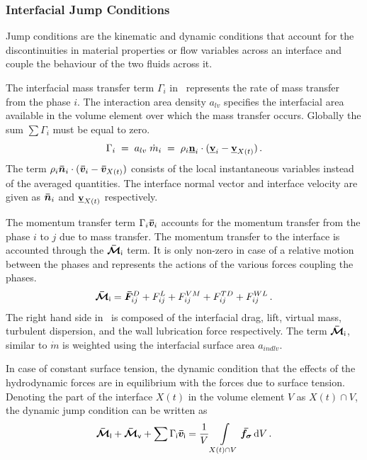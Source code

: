 \subsubsection{Interfacial Jump Conditions}\label{sec:jumps}
Jump conditions are the kinematic and dynamic conditions that 
account for the discontinuities in material properties 
or flow variables across an interface and couple the behaviour of the two 
fluids across it.

The interfacial mass transfer term $\Gamma_{i}$ in~
 represents the rate of mass transfer from the phase $i$. The interaction area density $a_{lv}$ specifies 
 the interfacial area available in the volume element over which the mass transfer occurs.
 Globally the sum $\sum\Gamma_{i}$ must be equal to zero.
\begin{equation}
 \Gamma_{i}\;=\;a_{lv}\;\dot{m}_{i}\;=\; \rho_{i} \mathbf{\underline{n}}_{i} \cdot (\mathbf{\underline{v}}_{i} - \mathbf{\underline{v}}_{X(t)})\,.
\end{equation}
The term $\rho_{i} \bm{\bar{n}}_{i} \cdot (\bm{\bar{v}}_{i} - \bm{\bar{v}}_{X(t)})$ consists of the local instantaneous 
 variables instead of the averaged quantities. The interface normal vector and interface 
 velocity are given as $\bm{\bar{n}}_{i}$ and $\mathbf{\underline{v}}_{X(t)}$ respectively. 

The momentum transfer term $\Gamma_{i}\bm{\bar{v}}_{i}$ accounts for the momentum transfer from 
 the phase $i$ to $j$ due to mass transfer. The momentum transfer to the interface is accounted through 
 the \(\bm{\bar{\mathcal{M}}}_{\mathsf {i}}\) term. It is only non-zero in case 
 of a relative motion between the phases and represents the actions of the various forces coupling the phases.
 \begin{equation}\label{eq:mom-trans}
  \bm{\bar{\mathcal{M}}}_{\mathsf {i}} = \bm{\bar{F}}_{ij}^{D} + F_{ij}^{L} + F_{ij}^{VM} + F_{ij}^{TD} + F_{ij}^{WL}\,.
 \end{equation}
The right hand side in~ is composed of the interfacial drag, lift, virtual mass, turbulent 
dispersion, and the wall lubrication force respectively. The term $\bm{\bar{\mathcal{M}}}_{\mathsf {i}}$, similar to
$\dot{m}$ is weighted using the interfacial surface area $a_{ind{lv}}$.

In case of constant surface tension, the dynamic condition that the effects of the hydrodynamic forces are 
 in equilibrium with the forces due to surface tension. Denoting the part of the interface $X(t)$ in the 
 volume element $V$ as $X(t) \cap V$, the dynamic jump condition can be written as
 \begin{equation}
  \bm{\bar{\mathcal{M}}}_{\mathsf {l}} + \bm{\bar{\mathcal{M}}}_{\mathsf {v}} + \sum \Gamma_{\mathsf {i}} \bm{\bar{v}}_{\mathsf {i}}
  =
  \frac{1}{V}\int\limits_{X(t) \cap V} 
    \bm{\bar{f_{\sigma}}}\,\mathrm{d}V\,.
 \end{equation}

